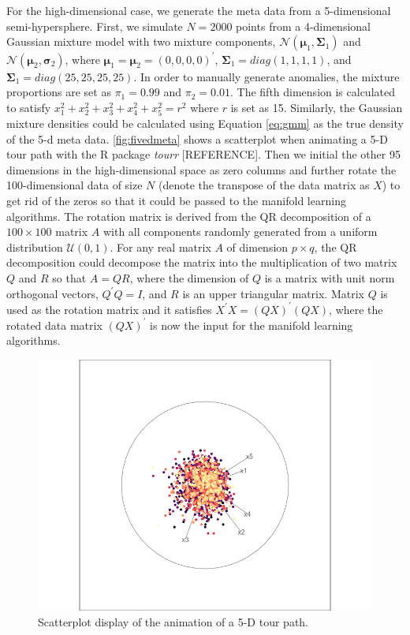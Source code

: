 \documentclass[11pt,a4paper,]{article}
\begin{document}
For the high-dimensional case, we generate the meta data from a 5-dimensional semi-hypersphere. First, we simulate \(N=2000\) points from a 4-dimensional Gaussian mixture model with two mixture components, \(\mathcal{N}(\pmb{\mu}_1, \pmb{\Sigma}_1)\) and \(\mathcal{N}(\pmb{\mu}_2, \pmb{\sigma}_2)\), where \(\pmb{\mu}_1 = \pmb{\mu}_2 =(0, 0, 0, 0)^\prime\), \(\pmb{\Sigma}_1 = diag(1,1,1,1)\), and \(\pmb{\Sigma}_1 = diag(25,25,25,25)\). In order to manually generate anomalies, the mixture proportions are set as \(\pi_1=0.99\) and \(\pi_2=0.01\).
The fifth dimension is calculated to satisfy \(x_1^2 + x_2^2 + x_3^2 + x_4^2 + x_5^2 = r^2\) where \(r\) is set as 15. Similarly, the Gaussian mixture densities could be calculated using Equation \eqref{eq:gmm} as the true density of the 5-d meta data. \autoref{fig:fivedmeta} shows a scatterplot when animating a 5-D tour path with the R package \emph{tourr} {[}REFERENCE{]}.
Then we initial the other 95 dimensions in the high-dimensional space as zero columns and further rotate the 100-dimensional data of size \(N\) (denote the transpose of the data matrix as \(X\)) to get rid of the zeros so that it could be passed to the manifold learning algorithms.
The rotation matrix is derived from the QR decomposition of a \(100\times 100\) matrix \(A\) with all components randomly generated from a uniform distribution \(\mathcal{U}(0,1)\).
For any real matrix \(A\) of dimension \(p\times q\), the QR decomposition could decompose the matrix into the multiplication of two matrix \(Q\) and \(R\) so that \(A = QR\), where the dimension of \(Q\) is a matrix with unit norm orthogonal vectors, \(Q^\prime Q = I\), and \(R\) is an upper triangular matrix. Matrix \(Q\) is used as the rotation matrix and it satisfies
\(X^\prime X=(QX)^\prime(QX)\), where the rotated data matrix \((QX)^\prime\) is now the input for the manifold learning algorithms.

\begin{figure}

{\centering \includegraphics[width=0.6\linewidth]{figures/tourr_5d_semisphere} 

}

\caption{Scatterplot display of the animation of a 5-D tour path.}\label{fig:fivedmeta}
\end{figure}
\end{document}
